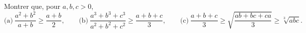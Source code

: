 Montrer que, pour $a, b, c > 0$,
\[ \text{(a)}\ \frac{a^2 + b^2}{a + b} \geq \frac{a + b}{2},\qquad \text{(b)}\ \frac{a^3 + b^3 + c^3}{a^2 + b^2 + c^2} \geq \frac{a + b + c}{3},\qquad \text{(c)}\ \frac{a + b + c}{3} \geq \sqrt{\frac{ab + bc + ca}{3}} \geq \sqrt[3]{abc}. \]
